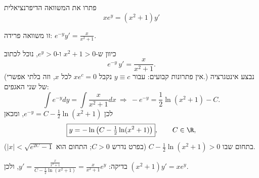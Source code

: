 
\begin{question}
פתרו את המשוואה הדיפרנציאלית
\[ xe^y=(x^2+1)y' \]
\end{question}

\begin{hint}
זו משוואה פרידה: $e^{-y}y'=\frac{x}{x^2+1}$.
\end{hint}

\begin{solution}
כיוון ש-$x^2+1>0$ ו-$e^y>0$, נוכל לכתוב
\[ e^{-y}\,y'=\frac{x}{x^2+1}. \]
(אין פתרונות קבועים: עבור $y\equiv c$ נקבל $xe^c=0$ לכל $x$, וזה בלתי אפשרי.) נבצע אינטגרציה של שני האגפים:
\[ \int e^{-y}dy=\int\frac{x}{x^2+1}dx\ \Longrightarrow\ -e^{-y}=\frac12\ln(x^2+1)-C. \]
לכן $e^{-y}=C-\frac12\ln(x^2+1)$, ומכאן
\[ \boxed{y=-\ln\left(C-\tfrac12\ln(x^2+1)\right)},\qquad C\in\R, \]
בתחום שבו $C-\frac12\ln(x^2+1)>0$ (בפרט נדרש $C>0$; התחום הוא $|x|<\sqrt{e^{2C}-1}$).

בדיקה: $y'=\frac{\frac{x}{x^2+1}}{C-\frac12\ln(x^2+1)}=\frac{x}{x^2+1}e^{y}$, ולכן $(x^2+1)y'=xe^y$.
\end{solution}
